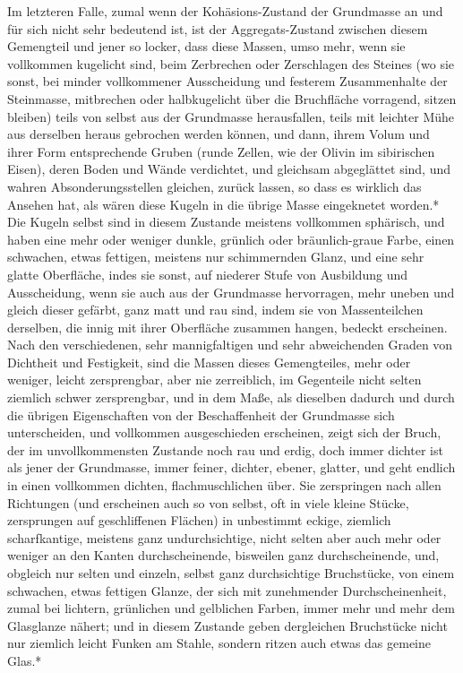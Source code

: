 \documentclass[a4paper, 11pt, oneside, german]{article}
\begin{document}
Im letzteren Falle, zumal wenn der Kohäsions-Zustand der Grundmasse an und für sich nicht sehr bedeutend ist, ist der Aggregats-Zustand zwischen diesem Gemengteil und jener so locker, dass diese Massen, umso mehr, wenn sie vollkommen kugelicht sind, beim Zerbrechen oder Zerschlagen des Steines (wo sie sonst, bei minder vollkommener Ausscheidung und festerem Zusammenhalte der Steinmasse, mitbrechen oder halbkugelicht über die Bruchfläche vorragend, sitzen bleiben) teils von selbst aus der Grundmasse herausfallen, teils mit leichter Mühe aus derselben heraus gebrochen werden können, und dann, ihrem Volum und ihrer Form entsprechende Gruben (runde Zellen, wie der Olivin im sibirischen Eisen), deren Boden und Wände verdichtet, und gleichsam abgeglättet sind, und wahren Absonderungsstellen gleichen, zurück lassen, so dass es wirklich das Ansehen hat, als wären diese Kugeln in die übrige Masse eingeknetet worden.* Die Kugeln selbst sind in diesem Zustande meistens vollkommen sphärisch, und haben eine mehr oder weniger dunkle, grünlich oder bräunlich-graue Farbe, einen schwachen, etwas fettigen, meistens nur schimmernden Glanz, und eine sehr glatte Oberfläche, indes sie sonst, auf niederer Stufe von Ausbildung und Ausscheidung, wenn sie auch aus der Grundmasse hervorragen, mehr uneben und gleich dieser gefärbt, ganz matt und rau sind, indem sie von Massenteilchen derselben, die innig mit ihrer Oberfläche zusammen hangen, bedeckt erscheinen. Nach den verschiedenen, sehr mannigfaltigen und sehr abweichenden Graden von Dichtheit und Festigkeit, sind die Massen dieses Gemengteiles, mehr oder weniger, leicht zersprengbar, aber nie zerreiblich, im Gegenteile nicht selten ziemlich schwer zersprengbar, und in dem Maße, als dieselben dadurch und durch die übrigen Eigenschaften von der Beschaffenheit der Grundmasse sich unterscheiden, und vollkommen ausgeschieden erscheinen, zeigt sich der Bruch, der im unvollkommensten Zustande noch rau und erdig, doch immer dichter ist als jener der Grundmasse, immer feiner, dichter, ebener, glatter, und geht endlich in einen vollkommen dichten, flachmuschlichen über. Sie zerspringen nach allen Richtungen (und erscheinen auch so von selbst, oft in viele kleine Stücke, zersprungen auf geschliffenen Flächen) in unbestimmt eckige, ziemlich scharfkantige, meistens ganz undurchsichtige, nicht selten aber auch mehr oder weniger an den Kanten durchscheinende, bisweilen ganz durchscheinende, und, obgleich nur selten und einzeln, selbst ganz durchsichtige Bruchstücke, von einem schwachen, etwas fettigen Glanze, der sich mit zunehmender Durchscheinenheit, zumal bei lichtern, grünlichen und gelblichen Farben, immer mehr und mehr dem Glasglanze nähert; und in diesem Zustande geben dergleichen Bruchstücke nicht nur ziemlich leicht Funken am Stahle, sondern ritzen auch etwas das gemeine Glas.*
\end{document}
